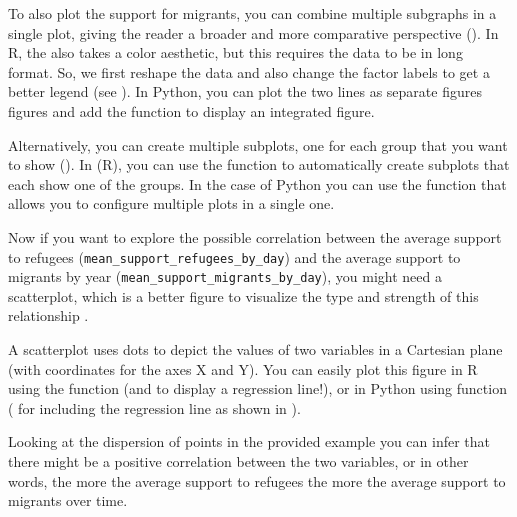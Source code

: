 To also plot the support for migrants, you can combine multiple subgraphs in a single plot,
giving the reader a broader and more comparative perspective ().
In R, the  also takes a color aesthetic, but this requires the data to be in long format.
So, we first reshape the data and also change the factor labels to get a better legend (see ).
In Python, you can plot the two lines as separate figures figures and add the  function  to display an integrated figure.


Alternatively, you can create multiple subplots, one for each group that you want to show ().
In  (R), you can use the  function to automatically create subplots that each show one of the groups. In the case of Python you can use the  function  that allows you to configure multiple plots in a single one.


Now if you want to explore the possible correlation between the average support to refugees (\texttt{mean\_support\_refugees\_by\_day}) and the average support to migrants by year (\texttt{mean\_support\_migrants\_by\_day}), you might need a scatterplot, which is a better figure to visualize the type and strength of this relationship . 


A scatterplot uses dots to depict the values of two variables in a Cartesian plane (with coordinates for the axes X and Y). You can easily plot this figure in R using the  function  (and  to display a regression line!), or in Python using  function  ( for including the regression line as shown in ). 


Looking at the dispersion of points in the provided example you can infer that there might be a positive correlation between the two variables, or in other words, the more the average support to refugees the more the average support to migrants over time.

